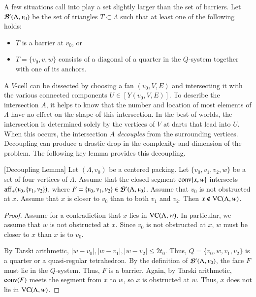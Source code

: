 A few situations call into play a set slightly larger than the set of barriers.
Let ${\mathcal B}'(\Lambda,v_0)$ be the set of triangles $T\subset \Lambda$ such that at least one
of the following holds:
\begin{itemize}
    \item $T$ is a barrier at $v_0$, or
    \item $T=\{v_0,v,w\}$ consists of a diagonal of a quarter in the
    $Q$-system together with one of its anchors.
\end{itemize}


A $V$-cell  can be dissected by choosing a fan
$(v_0,V,E)$ and intersecting it with the various connected components
$U\in [Y(v_0,V,E)]$.  To describe the intersection $A$, it
helps to know that the number and location of
most elements of $\Lambda$ have no effect on the shape of this intersection.
In the best of worlds, the intersection is determined solely 
by the vertices of $V$
at darts that lead into $U$.  When this occurs, the intersection $A$ 
{\it decouples} from the surrounding vertices. Decoupling  can
produce
a drastic drop in the complexity and dimension of the problem.
The following key lemma provides this decoupling.

\begin{lemma} [Decoupling Lemma]
Let $(\Lambda,v_0)$ be a centered packing.  Let $\{v_0,v_1,v_2,w\}$
be a set of four vertices of $\Lambda$. 
Assume that the closed segment
${\operatorname{conv}}\{x,w\}$ intersects ${\operatorname{aff}}_+(v_0,\{v_1,v_2\})$, where
$F = \{v_0,v_1,v_2\}\in {\mathcal B}'(\Lambda,v_0)$. Assume that $v_0$ 
is not obstructed at $x$. Assume that $x$ is closer to $v_0$ 
than to both $v_1$ and $v_2$. Then $x\not\in{\operatorname{VC}}(\Lambda,w)$.
\end{lemma}


\begin{proof}
Assume for a contradiction that $x$ lies in ${\operatorname{VC}}(\Lambda,w)$. In
particular, we assume that $w$ is not obstructed at $x$.  Since
$v_0$ is not obstructed at $x$, $w$ must be closer to $x$
than $x$ is to $v_0$.

By Tarski arithmetic, 
   $|w-v_0|,|w-v_1|,|w-v_2|\le 2t_0$.  Thus, $Q=\{v_0,w,v_1,v_2\}$ is
a quarter or a quasi-regular tetrahedron.  By the definition of
${\mathcal B}'(\Lambda,v_0)$, the face $F$ must lie in the $Q$-system.  Thus,
$F$ is a barrier.  Again, by Tarski arithmetic,
${\operatorname{conv}}(F)$ meets the segment from $x$ to $w$, so $x$ is obstructed
at $w$.  Thus, $x$ does not lie in ${\operatorname{VC}}(\Lambda,w)$.
\end{proof}

